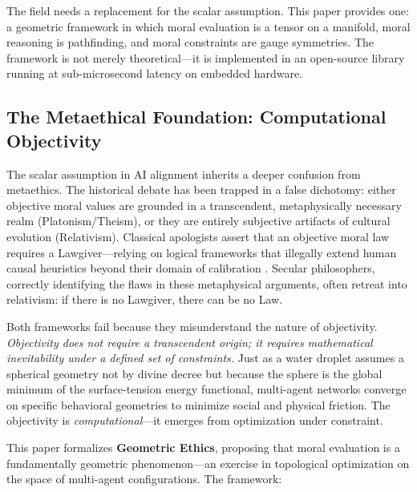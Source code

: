 \documentclass[12pt]{article}
\theoremstyle{definition}
\theoremstyle{remark}
\begin{document}
The field needs a replacement for the scalar assumption. This paper provides one: a geometric framework in which moral evaluation is a tensor on a manifold, moral reasoning is pathfinding, and moral constraints are gauge symmetries. The framework is not merely theoretical---it is implemented in an open-source library running at sub-microsecond latency on embedded hardware.

\subsection{The Metaethical Foundation: Computational Objectivity}

The scalar assumption in AI alignment inherits a deeper confusion from metaethics. The historical debate has been trapped in a false dichotomy: either objective moral values are grounded in a transcendent, metaphysically necessary realm (Platonism/Theism), or they are entirely subjective artifacts of cultural evolution (Relativism). Classical apologists assert that an objective moral law requires a Lawgiver---relying on logical frameworks that illegally extend human causal heuristics beyond their domain of calibration \citep{anon2026c}. Secular philosophers, correctly identifying the flaws in these metaphysical arguments, often retreat into relativism: if there is no Lawgiver, there can be no Law.

Both frameworks fail because they misunderstand the nature of objectivity. \emph{Objectivity does not require a transcendent origin; it requires mathematical inevitability under a defined set of constraints.} Just as a water droplet assumes a spherical geometry not by divine decree but because the sphere is the global minimum of the surface-tension energy functional, multi-agent networks converge on specific behavioral geometries to minimize social and physical friction. The objectivity is \emph{computational}---it emerges from optimization under constraint.

This paper formalizes \textbf{Geometric Ethics}, proposing that moral evaluation is a fundamentally geometric phenomenon---an exercise in topological optimization on the space of multi-agent configurations. The framework:
\end{document}
